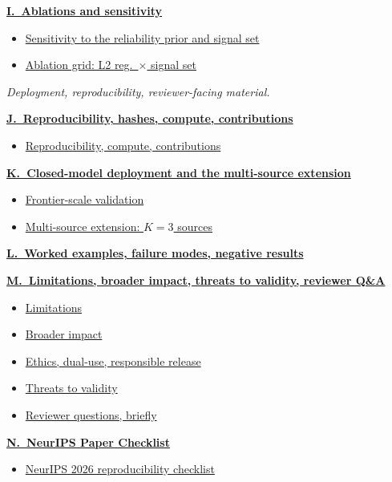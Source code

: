 \begin{tcolorbox}
{\textbf{\hyperref[app:letter-I]{I.\ Ablations and sensitivity}}
\begin{itemize}
  \item \hyperref[app:prior-sensitivity]{Sensitivity to the reliability prior and signal set}
  \item \hyperref[app:ablation-grid-fig]{Ablation grid: L2 reg.\ $\times$ signal set}
\end{itemize}

\textit{Deployment, reproducibility, reviewer-facing material.}

\textbf{\hyperref[app:letter-J]{J.\ Reproducibility, hashes, compute, contributions}}
\begin{itemize}
  \item \hyperref[app:reproducibility]{Reproducibility, compute, contributions}
\end{itemize}

\textbf{\hyperref[app:letter-K]{K.\ Closed-model deployment and the multi-source extension}}
\begin{itemize}
  \item \hyperref[app:frontier-validation]{Frontier-scale validation}
  \item \hyperref[app:multi-source-experiments]{Multi-source extension: $K\!=\!3$ sources}
\end{itemize}

\textbf{\hyperref[app:letter-L]{L.\ Worked examples, failure modes, negative results}}

\textbf{\hyperref[app:letter-M]{M.\ Limitations, broader impact, threats to validity, reviewer Q\&A}}
\begin{itemize}
  \item \hyperref[app:limitations]{Limitations}
  \item \hyperref[app:broader-impact]{Broader impact}
  \item \hyperref[app:ethics-dual-use]{Ethics, dual-use, responsible release}
  \item \hyperref[app:threats]{Threats to validity}
  \item \hyperref[app:reviewer-qa]{Reviewer questions, briefly}
\end{itemize}

\textbf{\hyperref[app:letter-N]{N.\ NeurIPS Paper Checklist}}
\begin{itemize}
  \item \hyperref[app:checklist]{NeurIPS 2026 reproducibility checklist}
\end{itemize}
}
\end{tcolorbox}

